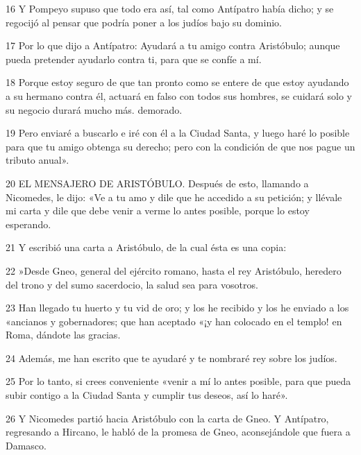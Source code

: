 \par 16 Y Pompeyo supuso que todo era así, tal como Antípatro había dicho; y se regocijó al pensar que podría poner a los judíos bajo su dominio.

\par 17 Por lo que dijo a Antípatro: Ayudará a tu amigo contra Aristóbulo; aunque pueda pretender ayudarlo contra ti, para que se confíe a mí.

\par 18 Porque estoy seguro de que tan pronto como se entere de que estoy ayudando a su hermano contra él, actuará en falso con todos sus hombres, se cuidará solo y su negocio durará mucho más. demorado.

\par 19 Pero enviaré a buscarlo e iré con él a la Ciudad Santa, y luego haré lo posible para que tu amigo obtenga su derecho; pero con la condición de que nos pague un tributo anual».

\par 20 EL MENSAJERO DE ARISTÓBULO. Después de esto, llamando a Nicomedes, le dijo: «Ve a tu amo y dile que he accedido a su petición; y llévale mi carta y dile que debe venir a verme lo antes posible, porque lo estoy esperando.

\par 21 Y escribió una carta a Aristóbulo, de la cual ésta es una copia:

\par 22 »Desde Gneo, general del ejército romano, hasta el rey Aristóbulo, heredero del trono y del sumo sacerdocio, la salud sea para vosotros.

\par 23 Han llegado tu huerto y tu vid de oro; y los he recibido y los he enviado a los «ancianos y gobernadores; que han aceptado «¡y han colocado en el templo! en Roma, dándote las gracias.

\par 24 Además, me han escrito que te ayudaré y te nombraré rey sobre los judíos.

\par 25 Por lo tanto, si crees conveniente «venir a mí lo antes posible, para que pueda subir contigo a la Ciudad Santa y cumplir tus deseos, así lo haré».

\par 26 Y Nicomedes partió hacia Aristóbulo con la carta de Gneo. Y Antípatro, regresando a Hircano, le habló de la promesa de Gneo, aconsejándole que fuera a Damasco.

